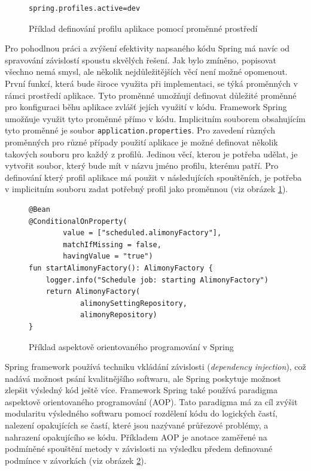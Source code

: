         \begin{figure}
            \begin{verbatim}
spring.profiles.active=dev
            \end{verbatim}
            \caption{Příklad definování profilu aplikace pomocí proměnné prostředí} 
            \label{code:current-spring-profile}
        \end{figure}
        Pro pohodlnou práci a zvýšení efektivity napsaného kódu Spring má navíc od spravování závislostí spoustu skvělých řešení. Jak bylo zmíněno, popisovat všechno nemá smysl, ale několik nejdůležitějších věcí není možné opomenout. První funkcí, která bude široce využita při implementaci, se týká proměnných v rámci prostředí aplikace. Tyto proměnné umožňují definovat důležité proměnné pro konfiguraci běhu aplikace zvlášť jejích využití v kódu. Framework Spring umožňuje využit tyto proměnné přímo v kódu. Implicitním souborem obsahujícím tyto proměnné je soubor \texttt{application.properties}. Pro zavedení různých proměnných pro různé případy použití aplikace je možné definovat několik takových souboru pro každý z profilů. Jedinou věcí, kterou je potřeba udělat, je vytvořit soubor, který bude mít v názvu jméno profilu, kterému patří. Pro definování který profil aplikace má použit v následujících spouštěních, je potřeba v implicitním souboru zadat potřebný profil jako proměnnou (viz obrázek \ref{code:current-spring-profile}). 
        
        
        \begin{figure}
            \begin{verbatim}
@Bean
@ConditionalOnProperty(
        value = ["scheduled.alimonyFactory"],
        matchIfMissing = false,
        havingValue = "true")
fun startAlimonyFactory(): AlimonyFactory {
    logger.info("Schedule job: starting AlimonyFactory")
    return AlimonyFactory(
            alimonySettingRepository,
            alimonyRepository)
}
            \end{verbatim}
            \caption{Příklad aspektově orientovaného programování v Spring} 
            \label{code:spring-conditional}
        \end{figure}
        Spring framework používá techniku vkládání závislosti (\textit{dependency injection}), což nadává možnost psání kvalitnějšího softwaru, ale Spring poskytuje možnost zlepšit výsledný kód ještě více. Framework Spring také používá paradigma aspektově orientovaného programování (AOP). Tato paradigma má za cíl zvýšit modularitu výsledného softwaru pomocí rozdělení kódu do logických častí, nalezení opakujících se častí, které jsou nazývané průřezové problémy, a nahrazení opakujícího se kódu. Příkladem AOP je anotace zaměřené na podmíněné spouštění metody v závislosti na výsledku předem definované podmínce v závorkách (viz obrázek \ref{code:spring-conditional}).
    
